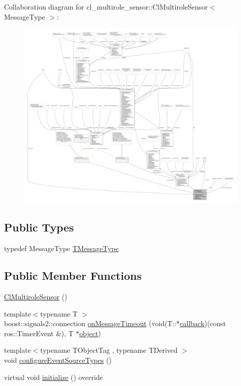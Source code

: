 Collaboration diagram for cl\+\_\+multirole\+\_\+sensor\+:\+:Cl\+Multirole\+Sensor$<$ Message\+Type $>$\+:
\nopagebreak
\begin{figure}[H]
\begin{center}
\leavevmode
\includegraphics[width=350pt]{classcl__multirole__sensor_1_1ClMultiroleSensor__coll__graph}
\end{center}
\end{figure}
\subsection*{Public Types}
\begin{DoxyCompactItemize}
\item 
typedef Message\+Type \hyperlink{classcl__multirole__sensor_1_1ClMultiroleSensor_a76f2c1e5c54556bacdaf0aaf809972da}{T\+Message\+Type}
\end{DoxyCompactItemize}
\subsection*{Public Member Functions}
\begin{DoxyCompactItemize}
\item 
\hyperlink{classcl__multirole__sensor_1_1ClMultiroleSensor_a25fcca3996fb5cbd5aa46cae4170e75e}{Cl\+Multirole\+Sensor} ()
\item 
{\footnotesize template$<$typename T $>$ }\\boost\+::signals2\+::connection \hyperlink{classcl__multirole__sensor_1_1ClMultiroleSensor_a9a2ffac7f03e1570bedc246ea4b00078}{on\+Message\+Timeout} (void(T\+::$\ast$\hyperlink{3_2servers_2opencv__perception__node_2opencv__perception__node_8cpp_a050e697bd654facce10ea3f6549669b3}{callback})(const ros\+::\+Timer\+Event \&), T $\ast$\hyperlink{classobject}{object})
\item 
{\footnotesize template$<$typename T\+Object\+Tag , typename T\+Derived $>$ }\\void \hyperlink{classcl__multirole__sensor_1_1ClMultiroleSensor_a48474056b15f9cb24c5582bfbd228187}{configure\+Event\+Source\+Types} ()
\item 
virtual void \hyperlink{classcl__multirole__sensor_1_1ClMultiroleSensor_a3847e19f925f65dd034964eb2d0b3594}{initialize} () override
\end{DoxyCompactItemize}
